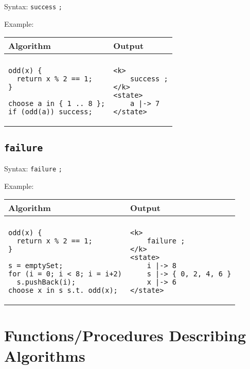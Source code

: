 \documentclass[a4paper]{report}
\begin{document}
Syntax: \verb"success" \verb";"

Example:
\begin{center}
\begin{tabular}{ll}
Algorithm & Output\\
\hline
\\
\begin{minipage}{.45\textwidth}
\begin{verbatim}
odd(x) {
  return x % 2 == 1;
}

choose a in { 1 .. 8 };
if (odd(a)) success;
\end{verbatim}
\end{minipage}
&
\begin{minipage}{.45\textwidth}
\begin{verbatim}
<k>
    success ;
</k>
<state>
    a |-> 7
</state>
\end{verbatim}
\end{minipage}
\end{tabular}
\end{center}

\subsection{\texttt{failure}}

Syntax: \verb"failure" \verb";"

Example:
\begin{center}
\begin{tabular}{ll}
Algorithm & Output\\
\hline
\\
\begin{minipage}{.45\textwidth}
\begin{verbatim}
odd(x) {
  return x % 2 == 1;
}

s = emptySet;
for (i = 0; i < 8; i = i+2)
  s.pushBack(i);
choose x in s s.t. odd(x);
\end{verbatim}
\end{minipage}
&
\begin{minipage}{.45\textwidth}
\begin{verbatim}
<k>
    failure ;
</k>
<state>
    i |-> 8
    s |-> { 0, 2, 4, 6 }
    x |-> 6
</state>
\end{verbatim}
\end{minipage}
\end{tabular}
\end{center}

\section{Functions/Procedures Describing Algorithms}
\end{document}
